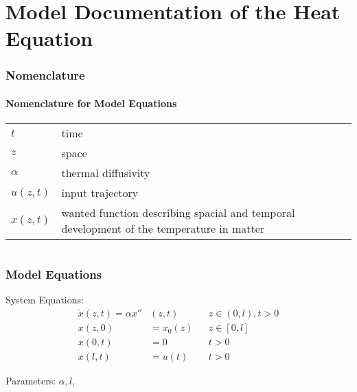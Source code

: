 \documentclass[10pt,a4paper]{article}
\begin{document}
	\part*{Model Documentation of the Heat Equation} %
	
	
	\section{Nomenclature} %
	\subsection{Nomenclature for Model Equations} %
	
	\begin{tabular}{ll}
		$t$ & time \\
		$z$ & space \\
		$\alpha$ & thermal diffusivity\\
		$u(z, t)$ & input trajectory \\
		$x(z, t)$ & wanted function describing spacial and temporal development of the temperature in matter
	\end{tabular}
	 
	
	\begin{tabular}{ll}

	\end{tabular}
	
	
	\section{Model Equations} %
	
	\noindent System Equations:			
	\begin{subequations}
	\begin{align*}
		\dot{x}(z,t) = \alpha x''&(z,t) && z\in (0, l), t>0\\
		x(z,0) &= x_0(z) && z\in [0,l]\\
		x(0,t) &= 0 && t>0\\
		x(l,t) &= u(t) && t>0
	\end{align*}
	\end{subequations}

	\noindent
	Parameters: $\alpha, l,$ %
\end{document}
